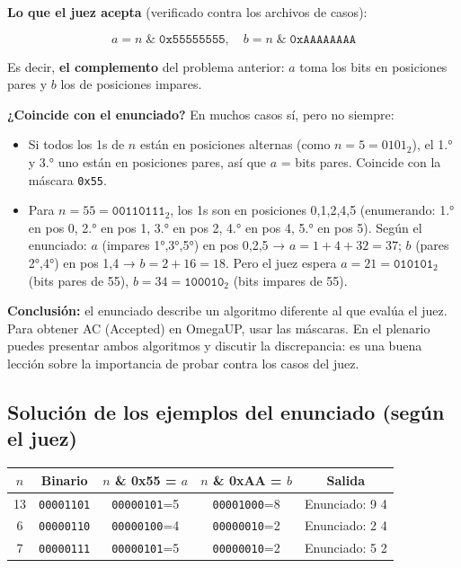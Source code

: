 \documentclass[12pt, oneside]{article}
\begin{document}
\begin{notaprofesor}
  \textbf{Lo que el juez acepta} (verificado contra los archivos de casos):

  \[
    a = n \;\&\; \texttt{0x55555555}, \quad b = n \;\&\; \texttt{0xAAAAAAAA}
  \]

  Es decir, \textbf{el complemento} del problema anterior: $a$ toma los bits
  en posiciones pares y $b$ los de posiciones impares.

  \textbf{¿Coincide con el enunciado?}  En muchos casos sí, pero no siempre:
  \begin{itemize}
    \item Si todos los 1s de $n$ están en posiciones alternas (como $n=5=0101_2$),
          el 1.° y 3.° uno están en posiciones pares, así que $a$ = bits pares.
          Coincide con la máscara \texttt{0x55}.
    \item Para $n=55=\texttt{00110111}_2$, los 1s son en posiciones 0,1,2,4,5
          (enumerando: 1.° en pos 0, 2.° en pos 1, 3.° en pos 2, 4.° en pos 4,
          5.° en pos 5).  Según el enunciado: $a$ (impares 1°,3°,5°) en pos 0,2,5 →
          $a = 1+4+32=37$; $b$ (pares 2°,4°) en pos 1,4 → $b=2+16=18$.
          Pero el juez espera $a=21=\texttt{010101}_2$ (bits pares de 55),
          $b=34=\texttt{100010}_2$ (bits impares de 55).
  \end{itemize}

  \textbf{Conclusión:} el enunciado describe un algoritmo diferente al que
  evalúa el juez.  Para obtener AC (Accepted) en OmegaUP, usar las máscaras.
  En el plenario puedes presentar ambos algoritmos y discutir la discrepancia:
  es una buena lección sobre la importancia de probar contra los casos del juez.
\end{notaprofesor}

\subsection{Solución de los ejemplos del enunciado (según el juez)}

\begin{center}
\begin{tabular}{ccccc}
  \toprule
  $n$ & Binario & $n$ \& 0x55 = $a$ & $n$ \& 0xAA = $b$ & Salida \\
  \midrule
  13 & \texttt{00001101} & \texttt{00000101}=5 & \texttt{00001000}=8 & Enunciado: 9 4 \\
   6 & \texttt{00000110} & \texttt{00000100}=4 & \texttt{00000010}=2 & Enunciado: 2 4 \\
   7 & \texttt{00000111} & \texttt{00000101}=5 & \texttt{00000010}=2 & Enunciado: 5 2 \\
  \bottomrule
\end{tabular}
\end{center}
\end{document}
